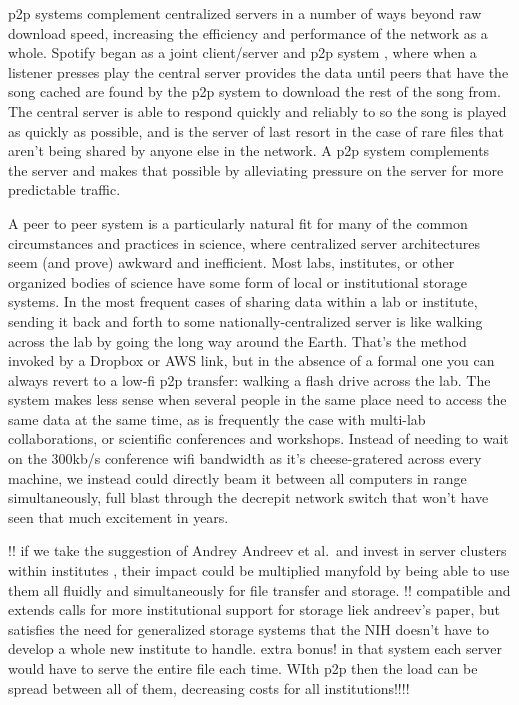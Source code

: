 \documentclass[10pt]{article}
\begin{document}
\begin{multicols}{2}
p2p systems complement centralized servers in a number of ways beyond
raw download speed, increasing the efficiency and performance of the
network as a whole. Spotify began as a joint client/server and p2p
system \cite{kreitzSpotifyLargeScale2010b} , where when a
listener presses play the central server provides the data until peers
that have the song cached are found by the p2p system to download the
rest of the song from. The central server is able to respond quickly and
reliably to so the song is played as quickly as possible, and is the
server of last resort in the case of rare files that aren't being shared
by anyone else in the network. A p2p system complements the server and
makes that possible by alleviating pressure on the server for more
predictable traffic.

A peer to peer system is a particularly natural fit for many of the
common circumstances and practices in science, where centralized server
architectures seem (and prove) awkward and inefficient. Most labs,
institutes, or other organized bodies of science have some form of local
or institutional storage systems. In the most frequent cases of sharing
data within a lab or institute, sending it back and forth to some
nationally-centralized server is like walking across the lab by going
the long way around the Earth. That's the method invoked by a Dropbox or
AWS link, but in the absence of a formal one you can always revert to a
low-fi p2p transfer: walking a flash drive across the lab. The system
makes less sense when several people in the same place need to access
the same data at the same time, as is frequently the case with multi-lab
collaborations, or scientific conferences and workshops. Instead of
needing to wait on the 300kb/s conference wifi bandwidth as it's
cheese-gratered across every machine, we instead could directly beam it
between all computers in range simultaneously, full blast through the
decrepit network switch that won't have seen that much excitement in
years.

!! if we take the suggestion of Andrey Andreev et al.~and invest in
server clusters within institutes \cite{andreevBiologistsNeedModern2021, charlesCommunityDrivenBigOpen2020} ,
their impact could be multiplied manyfold by being able to use them all
fluidly and simultaneously for file transfer and storage. !! compatible
and extends calls for more institutional support for storage liek
andreev's paper, but satisfies the need for generalized storage systems
that the NIH doesn't have to develop a whole new institute to handle.
extra bonus! in that system each server would have to serve the entire
file each time. WIth p2p then the load can be spread between all of
them, decreasing costs for all institutions!!!!


\end{multicols}
\end{document}
